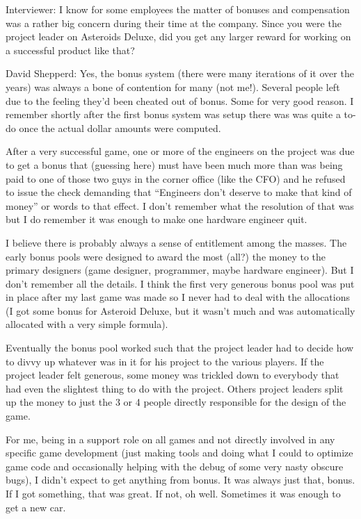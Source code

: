 \textcolor{interviewer}{Interviewer:} I know for some employees the matter of bonuses and compensation was a rather big concern during their time at the company. Since you were the project leader on Asteroids Deluxe, did you get any larger reward for working on a successful product like that?

\textcolor{interviewee}{David Shepperd:} Yes, the bonus system (there were many iterations of it over the years) was always a bone of contention for many (not me!). Several people left due to the feeling they'd been cheated out of bonus. Some for very good reason. I remember shortly after the first bonus system was setup there was was quite a to-do once the actual dollar amounts were computed. 

After a very successful game, one or more of the engineers on the project was due to get a bonus that (guessing here) must have been much more than was being paid to one of those two guys in the corner office (like the CFO) and he refused to issue the check demanding that “Engineers don't deserve to make that kind of money” or words to that effect. I don't remember what the resolution of that was but I do remember it was enough to make one hardware engineer quit. 

I believe there is probably always a sense of entitlement among the masses. The early bonus pools were designed to award the most (all?) the money to the primary designers (game designer, programmer, maybe hardware engineer). But I don't remember all the details. I think the first very generous bonus pool was put in place after my last game was made so I never had to deal with the allocations (I got some bonus for Asteroid Deluxe, but it wasn't much and was automatically allocated with a very simple formula). 

Eventually the bonus pool worked such that the project leader had to decide how to divvy up whatever was in it for his project to the various players. If the project leader felt generous, some money was trickled down to everybody that had even the slightest thing to do with the project. Others project leaders split up the money to just the 3 or 4 people directly responsible for the design of the game. 

For me, being in a support role on all games and not directly involved in any specific game development (just making tools and doing what I could to optimize game code and occasionally helping with the debug of some very nasty obscure bugs), I didn't expect to get anything from bonus. It was always just that, bonus. If I got something, that was great. If not, oh well. Sometimes it was enough to get a new car.

